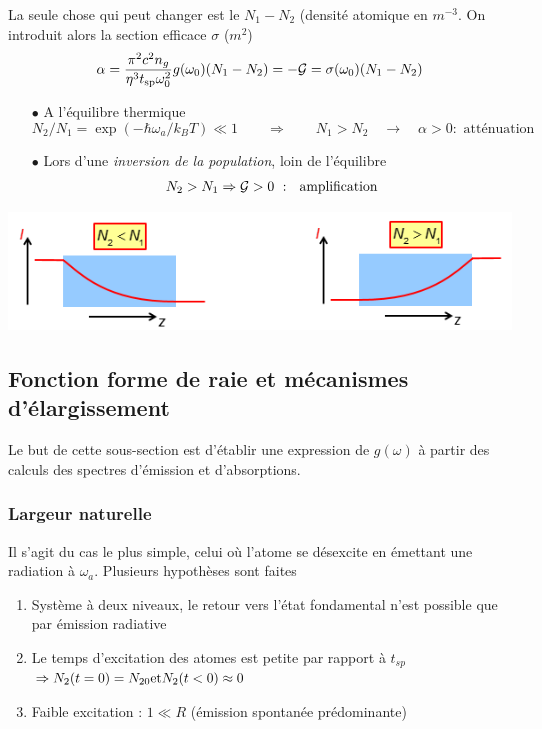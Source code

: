 	La seule chose qui peut changer est le $N_1-N_2$ (densité atomique en $m^{-3}$. On introduit 
	alors la section efficace $\sigma$ ($m^2$)
	\begin{equation}
	\alpha  = \frac{{{\pi ^2}{c^2}{n_g}}}{{{\eta ^3}{t_{{\rm{sp}}}}\omega _0^2}}g({\omega _0})({N_1} - {N_2}) =  - {\cal G} = \sigma ({\omega _0})({N_1} - {N_2})
	\end{equation}
	\begin{itemize}
	\item[$\bullet$] A l'équilibre thermique
	\begin{equation}
	{N_2}/{N_1} = \exp ( - \hbar {\omega _a}/{k_B}T) \ll 1\qquad\Rightarrow\qquad N_1>N_2\quad 
	\rightarrow\quad \alpha>0 : \text{ atténuation}
	\end{equation}
	\item[$\bullet$] Lors d'une \textit{inversion de la population}, loin de l'équilibre
	\begin{equation}
	{N_2} > {N_1} \Rightarrow {\cal G} > 0\ :\ \text{ amplification}
	\end{equation}
	\end{itemize}
	
	\begin{center}
		\includegraphics[scale=0.75]{ch2/image16.png}
	\end{center}
	
	\subsection{Fonction forme de raie et mécanismes d'élargissement}
	Le but de cette sous-section est d'établir une expression de $g(\omega)$ à partir des 
	calculs des spectres d'émission et d'absorptions.
	
	\subsubsection{Largeur naturelle}
	Il s'agit du cas le plus simple, celui où l'atome se désexcite en émettant une radiation 
	à $\omega_a$. Plusieurs hypothèses sont faites 
	\begin{enumerate}
	\item Système à deux niveaux, le retour vers l'état fondamental n'est possible que par 
	émission radiative
	\item Le temps d'excitation des atomes est petite par rapport à $t_{sp}$ $\Rightarrow {N_2}(t = 0) 
	= {N_{20}}{\rm{  et   }}{N_2}(t < 0) \approx 0$
	\item Faible excitation : $1\ll R$ (émission spontanée prédominante)
	\end{enumerate}
	
